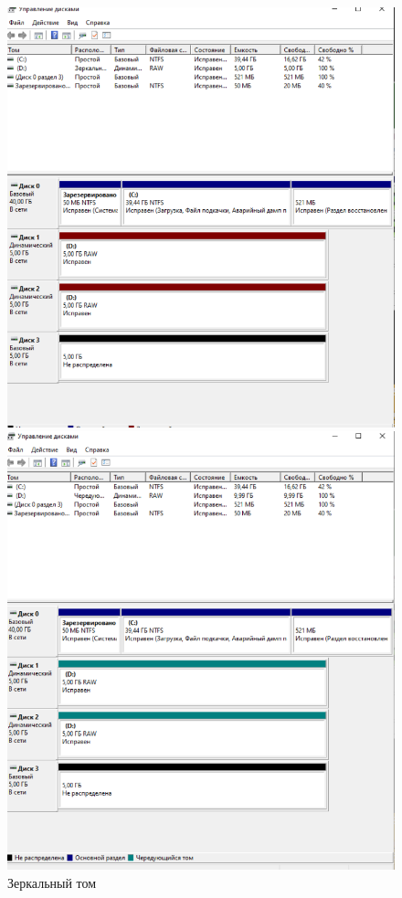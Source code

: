 \documentclass[a4paper,14pt]{extarticle}
\begin{document}
\begin{figure}[h]
	\begin{center}
		\begin{minipage}[h]{0.42\linewidth}
			\includegraphics[width=1\linewidth]{images/mirror2}
			\caption{Зеркальный том} %
			\label{ris:mirror2} %
		\end{minipage}
		\hfill
		\begin{minipage}[h]{0.42\linewidth}
			\includegraphics[width=1\linewidth]{images/chain2}

\end{minipage}
\end{center}
\end{figure}
\end{document}
